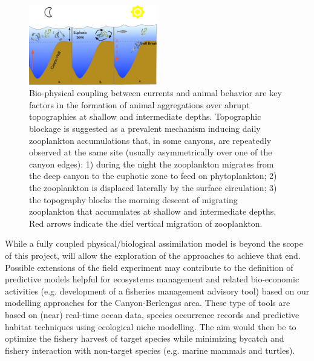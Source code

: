 \begin{figure}
  \centering
  \includegraphics[width=0.5\textwidth]{fig/plankton-canyon.jpg}
  \caption{Bio-physical coupling between currents and animal behavior
    are key factors in the formation of animal aggregations over
    abrupt topographies at shallow and intermediate
    depths. Topographic blockage is suggested as a prevalent mechanism
    inducing daily zooplankton accumulations that, in some canyons,
    are repeatedly observed at the same site (usually asymmetrically
    over one of the canyon edges): 1) during the night the zooplankton
    migrates from the deep canyon to the euphotic zone to feed on
    phytoplankton; 2) the zooplankton is displaced laterally by the
    surface circulation; 3) the topography blocks the morning descent
    of migrating zooplankton that accumulates at shallow and
    intermediate depths.  Red arrows indicate the diel vertical
    migration of zooplankton.}
  \label{fig:plankton}
  \vspace{-1cm}
\end{figure}

While a fully coupled physical/biological assimilation model is beyond
the scope of this project, \proj will allow the exploration of the
approaches to achieve that end.  Possible extensions of the field
experiment may contribute to the definition of predictive models
helpful for ecosystems management and related bio-economic activities
(e.g. development of a fisheries management advisory tool) based on
our modelling approaches for the \naz Canyon-Berlengas area. These
type of tools are based on (near) real-time ocean data, species
occurrence records and predictive habitat techniques using ecological
niche modelling. The aim would then be to optimize the fishery harvest
of target species while minimizing bycatch and fishery interaction
with non-target species (e.g. marine mammals and turtles).


